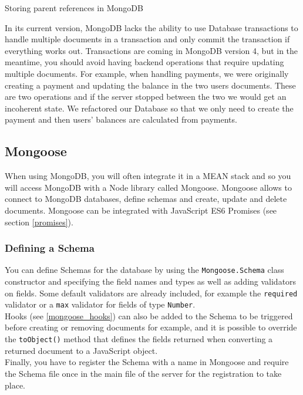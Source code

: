 \documentclass[twoside, openright,11pt,a4paper]{book}
\newenvironment{code}{\captionsetup{type=listing}}{}
\begin{document}
\begin{code}
	\caption{Storing parent references in MongoDB}
\end{code}

In its current version, MongoDB lacks the ability to use Database transactions to handle multiple documents in a transaction and only commit the transaction if everything works out. Transactions are coming in MongoDB version 4, but in the meantime, you should avoid having backend operations that require updating multiple documents. For example, when handling payments, we were originally creating a payment and updating the balance in the two users documents. These are two operations and if the server stopped between the two we would get an incoherent state. We refactored our Database so that we only need to create the payment and then users' balances are calculated from payments.
\subsection{Mongoose}
When using MongoDB, you will often integrate it in a MEAN\cite{mean:website} stack and so you will access MongoDB with a Node library called Mongoose\cite{mongoose:website}. Mongoose allows to connect to MongoDB databases, define schemas and create, update and delete documents. Mongoose can be integrated with JavaScript ES6 Promises (see section \ref{promises}).
\subsubsection{Defining a Schema}
You can define Schemas\cite{mongoose:doc:schemas} for the database by using the \verb+Mongoose.Schema+ class constructor and specifying the field names and types as well as adding validators on fields. Some default validators are already included, for example the \verb+required+ validator or a \verb+max+ validator for fields of type \verb+Number+. \\

Hooks (see \ref{mongoose_hooks}) can also be added to the Schema to be triggered before creating or removing documents for example, and it is possible to override the \verb+toObject()+ method that defines the fields returned when converting a returned document to a JavaScript object. \\

Finally, you have to register the Schema with a name in Mongoose and require the Schema file once in the main file of the server for the registration to take place.\\
\end{document}
